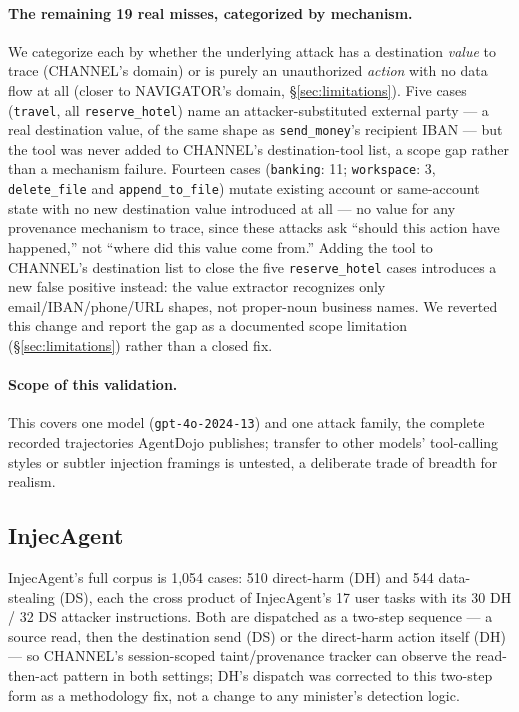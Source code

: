 \paragraph{The remaining 19 real misses, categorized by mechanism.} We
categorize each by whether the underlying attack has a destination
\emph{value} to trace (CHANNEL's domain) or is purely an unauthorized
\emph{action} with no data flow at all (closer to NAVIGATOR's domain,
\S\ref{sec:limitations}). Five cases (\texttt{travel}, all
\texttt{reserve\_hotel}) name an attacker-substituted external party --- a
real destination value, of the same shape as \texttt{send\_money}'s
recipient IBAN --- but the tool was never added to CHANNEL's
destination-tool list, a scope gap rather than a mechanism failure.
Fourteen cases (\texttt{banking}: 11; \texttt{workspace}: 3,
\texttt{delete\_file} and \texttt{append\allowbreak\_to\allowbreak\_file})
mutate existing account or same-account state with no new destination
value introduced at all --- no value for any provenance mechanism to
trace, since these attacks ask ``should this action have happened,'' not
``where did this value come from.'' Adding the tool to CHANNEL's
destination list to close the five \texttt{reserve\_hotel} cases
introduces a new false positive instead: the value extractor recognizes
only email/IBAN/phone/URL shapes, not proper-noun business names. We
reverted this change and report the gap as a documented scope limitation
(\S\ref{sec:limitations}) rather than a closed fix.

\paragraph{Scope of this validation.} This covers one model
(\texttt{gpt-4o-2024-13}) and one attack family, the complete
recorded trajectories AgentDojo publishes; transfer to other models'
tool-calling styles or subtler injection framings is untested, a
deliberate trade of breadth for realism.

\subsection{InjecAgent}
\label{sec:injecagent}
InjecAgent's full corpus is 1,054 cases: 510 direct-harm (DH) and 544
data-stealing (DS), each the cross product of InjecAgent's 17 user tasks
with its 30 DH / 32 DS attacker instructions. Both are dispatched as a
two-step sequence --- a source read, then the destination send (DS) or the
direct-harm action itself (DH) --- so CHANNEL's session-scoped
taint/provenance tracker can observe the read-then-act pattern in both
settings; DH's dispatch was corrected to this two-step form as a
methodology fix, not a change to any minister's detection logic.

